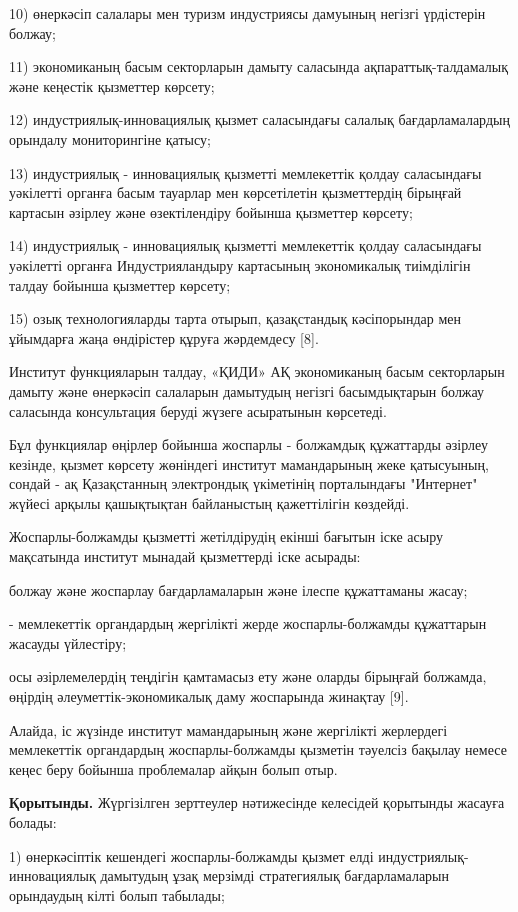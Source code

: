 \begin{multicols}{2}
10) өнеркәсіп салалары мен туризм индустриясы дамуының негізгі
үрдістерін болжау;

11) экономиканың басым секторларын дамыту саласында
ақпараттық-талдамалық және кеңестік қызметтер көрсету;

12) индустриялық-инновациялық қызмет саласындағы салалық
бағдарламалардың орындалу мониторингіне қатысу;

13) индустриялық - инновациялық қызметті мемлекеттік қолдау саласындағы
уәкілетті органға басым тауарлар мен көрсетілетін қызметтердің бірыңғай
картасын әзірлеу және өзектілендіру бойынша қызметтер көрсету;

14) индустриялық - инновациялық қызметті мемлекеттік қолдау саласындағы
уәкілетті органға Индустрияландыру картасының экономикалық тиімділігін
талдау бойынша қызметтер көрсету;

15) озық технологияларды тарта отырып, қазақстандық кәсіпорындар мен
ұйымдарға жаңа өндірістер құруға жәрдемдесу {[}8{]}.

Институт функцияларын талдау, «ҚИДИ» АҚ экономиканың басым секторларын
дамыту және өнеркәсіп салаларын дамытудың негізгі басымдықтарын болжау
саласында консультация беруді жүзеге асыратынын көрсетеді.

Бұл функциялар өңірлер бойынша жоспарлы - болжамдық құжаттарды әзірлеу
кезінде, қызмет көрсету жөніндегі институт мамандарының жеке қатысуының,
сондай - ақ Қазақстанның электрондық үкіметінің порталындағы "Интернет"
жүйесі арқылы қашықтықтан байланыстың қажеттілігін көздейді.

Жоспарлы-болжамды қызметті жетілдірудің екінші бағытын іске асыру
мақсатында институт мынадай қызметтерді іске асырады:

болжау және жоспарлау бағдарламаларын және ілеспе құжаттаманы жасау;

- мемлекеттік органдардың жергілікті жерде жоспарлы-болжамды құжаттарын
жасауды үйлестіру;

осы әзірлемелердің теңдігін қамтамасыз ету және оларды бірыңғай
болжамда, өңірдің әлеуметтік-экономикалық даму жоспарында жинақтау
{[}9{]}.

Алайда, іс жүзінде институт мамандарының және жергілікті жерлердегі
мемлекеттік органдардың жоспарлы-болжамды қызметін тәуелсіз бақылау
немесе кеңес беру бойынша проблемалар айқын болып отыр.

{\bfseries Қорытынды.} Жүргізілген зерттеулер нәтижесінде келесідей
қорытынды жасауға болады:

1) өнеркәсіптік кешендегі жоспарлы-болжамды қызмет елді
индустриялық-инновациялық дамытудың ұзақ мерзімді стратегиялық
бағдарламаларын орындаудың кілті болып табылады;


\end{multicols}
